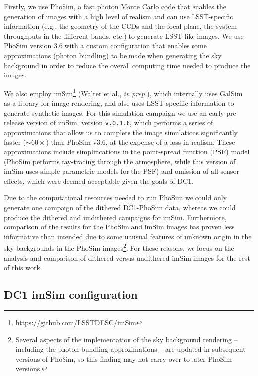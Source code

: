 \documentclass[\docopts]{\docclass}
\begin{document}
Firstly, we use PhoSim, a fast photon Monte Carlo code that enables the generation of images with a high level of realism and can use LSST-specific information (e.g., the geometry of the CCDs and the focal plane, the system throughputs in the different bands, etc.) to generate LSST-like images. We use PhoSim version 3.6 with a custom configuration that enables some
approximations (photon bundling) to be made when generating the sky background in order to reduce the overall computing time needed to produce the images.

We also employ imSim\footnote{\url{https://github.com/LSSTDESC/imSim}} (Walter et al., {\em in prep.}), which internally uses GalSim~\citep{2015A&C....10..121R} as a library for image rendering, and also uses LSST-specific information to generate synthetic images. For this simulation campaign we use an early pre-release version of imSim, version \texttt{v.0.1.0}, which performs a series of approximations that allow us to complete the image simulations significantly faster ($\sim 60\times$) than PhoSim v3.6, at the expense of a loss in realism. These approximations include simplifications in the point-spread function (PSF) model (PhoSim performs ray-tracing through the atmosphere, while this version of imSim uses simple parametric models for the PSF) and omission of all sensor effects, which were deemed acceptable given the goals of DC1.

Due to the computational resources needed to run PhoSim we could only generate one campaign of the dithered DC1-PhoSim data, whereas we could produce the dithered and undithered campaigns for imSim. Furthermore, comparison of the results for the PhoSim and imSim images has proven less informative than intended due to some unusual features of unknown origin in the sky backgrounds in the PhoSim images\footnote{Several aspects of the implementation of the sky background rendering -- including the photon-bundling approximations -- are updated in subsequent versions of PhoSim, so this finding may not carry over to later PhoSim versions.}. For these reasons, we focus on the analysis and comparison of dithered versus undithered imSim images for the rest of this work.

\subsection{DC1 imSim configuration}
\label{sec:imsim_pipeline}

\end{document}
